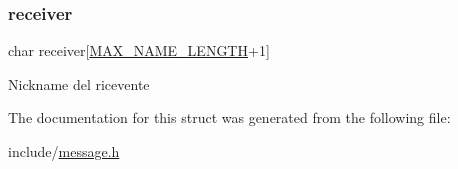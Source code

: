 \subsubsection{\texorpdfstring{receiver}{receiver}}
{\footnotesize\ttfamily char receiver\mbox{[}\hyperlink{config_8h_a0c397a708cec89c74029582574516b30}{M\+A\+X\+\_\+\+N\+A\+M\+E\+\_\+\+L\+E\+N\+G\+TH}+1\mbox{]}}

Nickname del ricevente 

The documentation for this struct was generated from the following file\+:\begin{DoxyCompactItemize}
\item 
include/\hyperlink{message_8h}{message.\+h}\end{DoxyCompactItemize}

